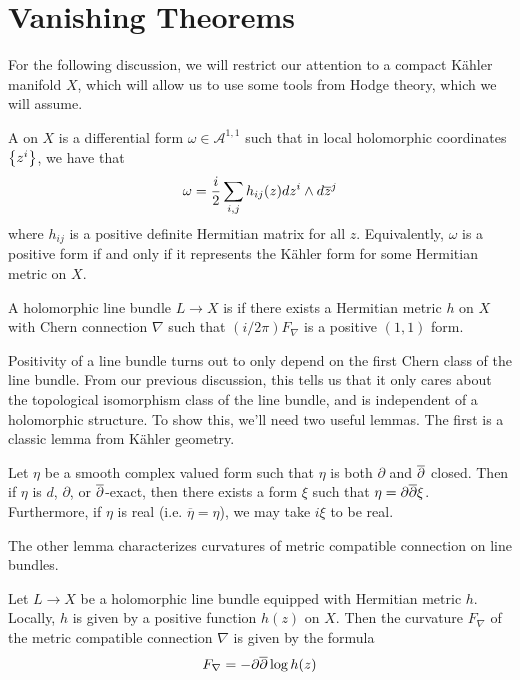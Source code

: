 %
\section{Vanishing Theorems}
%
\iffalse
\emph{It was said about Lefschetz that he had never stated a false theorem or gave a
correct proof.} \\
\fi

For the following discussion, we will restrict our attention to a compact K\"ahler
manifold $X$, which will allow us to use some tools from Hodge theory, which we will
assume.
%
\begin{defn}
A  on $X$ is a
differential form $\omega \in \mathcal{A}^{1,1}$ such that in local
holomorphic coordinates $\left\lbrace z^i \right\rbrace$, we have that
\[
\omega = \frac{i}{2} \sum_{i,j} h_{ij}(z) dz^i \wedge d\overline{z}^j
\]
where $h_{ij}$ is a positive definite Hermitian matrix for all $z$. Equivalently,
$\omega$ is a positive form if and only if it represents the K\"ahler form for some
Hermitian metric on $X$.
\end{defn}
%
\begin{defn}
A holomorphic line bundle $L \to X$ is  if there exists a Hermitian metric
$h$ on $X$ with Chern connection $\nabla$ such that $(i/2\pi)F_\nabla$ is a
positive $(1,1)$ form.
\end{defn}
%
Positivity of a line bundle turns out to only depend on the first Chern class of
the line bundle. From our previous discussion, this tells us that it only cares
about the topological isomorphism class of the line bundle, and is independent of
a holomorphic structure. To show this, we'll need two useful lemmas.
The first is a classic lemma from K\"ahler geometry.
%
\begin{lem}
Let $\eta$ be a smooth complex valued form such that $\eta$ is both $\partial$ and
$\overline{\partial}$ closed. Then if $\eta$ is $d$, $\partial$, or $\overline{\partial}$-exact, then there
exists a form $\xi$ such that $\eta = \partial\overline{\partial}\xi$. Furthermore, if $\eta$ is
real (i.e. $\overline{\eta} = \eta$), we may take $i\xi$ to be real.
\end{lem}
%
The other lemma characterizes curvatures of metric compatible connection on line
bundles.
%
\begin{lem}
Let $L \to X$ be a holomorphic line bundle equipped with Hermitian metric $h$. Locally,
$h$ is given by a positive function $h(z)$ on $X$. Then the curvature $F_\nabla$ of
the metric compatible connection $\nabla$ is given by the formula
\[
F_\nabla = -\partial\overline{\partial}\log h(z)
\]
\end{lem}
